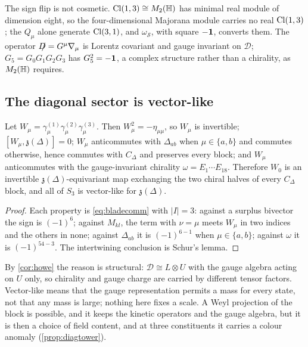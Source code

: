 The sign flip is not cosmetic. $\Cl(1,3)\cong M_2(\HH)$ has minimal real module of dimension eight, so the four-dimensional Majorana module
carries no real $\Cl(1,3)$; the $Q_\mu$ alone generate $\Cl(3,1)$, and $\omega_{\mathcal S}$, with square $-\id$, converts them. The operator
$\slashed D=G^\mu\nabla_\mu$ is Lorentz covariant and gauge invariant on $\mathcal D$; $G_5=G_0G_1G_2G_3$ has $G_5^2=-\id$, a complex structure
rather than a chirality, as $M_2(\HH)$ requires.

\subsection{The diagonal sector is vector-like}

\begin{theorem}
\label{thm:diagvectorlike}
Let $W_\mu=\gamma^{(1)}_\mu\gamma^{(2)}_\mu\gamma^{(3)}_\mu$. Then $W_\mu^2=-\eta_{\mu\mu}$, so $W_\mu$ is invertible; $[W_\mu,\mathfrak z(\Delta)]=0$;
$W_\mu$ anticommutes with $\Delta_{ab}$ when $\mu\in\{a,b\}$ and commutes otherwise, hence commutes with $C_\Delta$ and preserves every block;
and $W_\mu$ anticommutes with the gauge-invariant chirality $\omega=E_1\cdots E_{18}$. Therefore $W_0$ is an invertible
$\mathfrak z(\Delta)$-equivariant map exchanging the two chiral halves of every $C_\Delta$ block, and all of $S_3$ is vector-like for $\mathfrak z(\Delta)$.
\end{theorem}

\begin{proof}
Each property is \eqref{eq:bladecomm} with $|I|=3$: against a surplus bivector the sign is $(-1)^{6}$; against $M_{kl}$, the term with $\nu=\mu$
meets $W_\mu$ in two indices and the others in none; against $\Delta_{ab}$ it is $(-1)^{6-1}$ when $\mu\in\{a,b\}$; against $\omega$ it is
$(-1)^{54-3}$. The intertwining conclusion is Schur's lemma.
\end{proof}

By \cref{cor:howe} the reason is structural: $\mathcal D\cong L\otimes U$ with the gauge algebra acting on $U$ only, so chirality and gauge charge
are carried by different tensor factors. Vector-like means that the gauge representation permits a mass for every state, not that any mass is
large; nothing here fixes a scale. A Weyl projection of the block is possible, and it keeps the kinetic operators and the gauge algebra, but it
is then a choice of field content, and at three constituents it carries a colour anomaly (\cref{prop:diagtower}).

